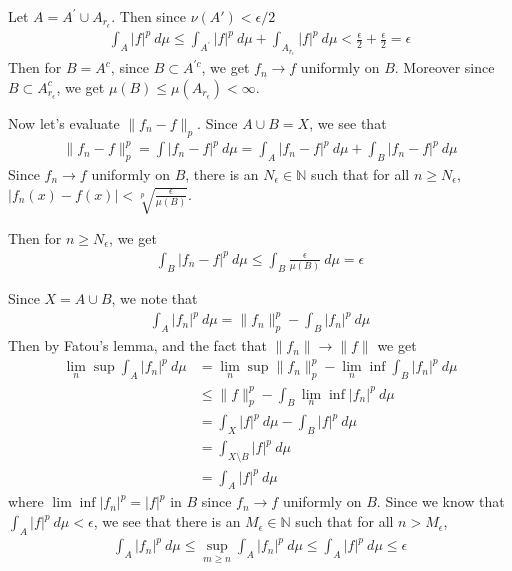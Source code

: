 \documentclass[12pt]{exam}
\theoremstyle{plain} %
\theoremstyle{definition} %
\theoremstyle{remark} %
\begin{document}
\begin{questions}
\begin{solution}
    Let $A = A^\prime \cup A_{r_\epsilon}$. Then since $\nu(A') < \epsilon/2$
    \begin{align*}
      \int_A |f|^p \ d \mu \le \int_{A^\prime} |f|^p \ d \mu +
      \int_{A_{r_\epsilon}} |  f|^p \ d \mu < \frac{\epsilon}{2} +
      \frac{\epsilon}{2} = \epsilon
    \end{align*}
    Then for $B = A^c$, since $B \subset A^{\prime  c}$, we get $f_n
    \to f$ uniformly on $B$. Moreover since $B \subset
    A_{r_\epsilon}^c$, we get $\mu(B) \le \mu(A_{r_\epsilon}) < \infty$.

    Now let's evaluate $\|f_n  - f\|_p$. Since $A \cup B = X$, we see that
    \begin{align}
      \label{eq:1}
      \|f_n - f\|_p^p = \int |f_n - f|^p \ d \mu = \int_A |f_n - f|^p
      \ d \mu + \int_B|f_n - f|^p \ d \mu
    \end{align}
    Since $f_n \to f$ uniformly on $B$, there is an $N_\epsilon \in
    \mathbb{N}$ such that for all $n \ge N_\epsilon$, $|f_n(x) - f(x)|
    < \sqrt[p]{\frac{\epsilon}{\mu(B)}}$.

    Then for $n \ge N_\epsilon$, we get
    \begin{align*}
      \int_B |f_n - f|^p \ d \mu \le \int_B \frac{\epsilon}{\mu(B)}
      \ d \mu = \epsilon
    \end{align*}
  \end{solution}
  Since $X = A \cup B$, we note that
  \begin{align*}
    \int_A |f_n|^p \ d \mu = \|f_n\|_p^p - \int_B |f_n|^p \ d \mu
  \end{align*}
  Then by Fatou's lemma, and the fact that $\|f_n\| \to \|f\|$ we get
  \begin{align*}
    \lim_n \sup \int_A |f_n|^p \ d \mu &= \lim_n \sup \|f_n\|_p^p -
    \lim_n \inf \int_B |f_n|^p \ d \mu \\
    &\le \|f\|_p^p - \int_B \lim_n \inf |f_n|^p \ d \mu \\
    &= \int_X |f|^p \ d \mu - \int_B |f|^p \ d \mu \\
    &= \int_{X \setminus B} |f|^p\ d \mu \\
    &= \int_A |f|^p \ d \mu
  \end{align*}
  where $\lim \inf |f_n|^p = |f|^p$ in $B$ since $f_n \to f$ uniformly  on $B$.
  Since we know that $\int_A |f|^p \ d \mu < \epsilon$, we see that
  there is an $M_\epsilon \in \mathbb{N}$ such that for all $n > M_\epsilon$,
  \begin{align*}
    \int_A |f_n|^p \ d \mu \le \sup_{m \ge n} \int_A |f_n|^p \ d \mu
    \le \int_A |f|^p \ d \mu \le \epsilon
  \end{align*}


\end{questions}
\end{document}
